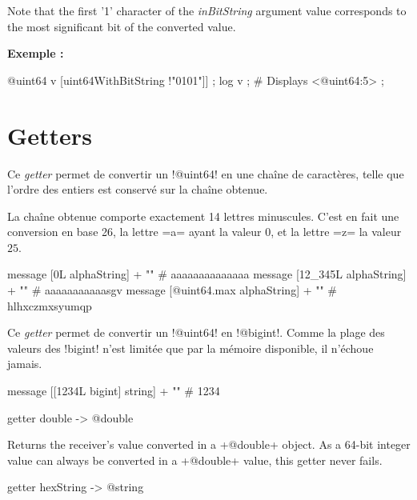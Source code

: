 Note that the first '1' character of the \emph{inBitString} argument value corresponds to the most significant bit of the converted value.

\textbf{Exemple :}
\begin{galgas3}
@uint64 v [uint64WithBitString !"0101"]] ;
log v ; # Displays <@uint64:5> ;
\end{galgas3}


\section{Getters}



Ce \emph{getter} permet de convertir un \ggst!@uint64! en une chaîne de caractères, telle que l'ordre des entiers est conservé sur la chaîne obtenue.

La chaîne obtenue comporte exactement 14 lettres minuscules. C'est en fait une conversion en base 26, la lettre \ggst=a= ayant la valeur $0$, et la lettre \ggst=z= la valeur $25$.


\begin{galgas3}
  message [0L alphaString] + "\n"          # aaaaaaaaaaaaaa
  message [12_345L alphaString] + "\n"     # aaaaaaaaaaasgv
  message [@uint64.max alphaString] + "\n" # hlhxczmxsyumqp
\end{galgas3}


Ce \emph{getter} permet de convertir un \ggst!@uint64! en \ggst!@bigint!. Comme la plage des valeurs des \ggst!bigint! n'est limitée que par la mémoire disponible, il n'échoue jamais.

\begin{galgas3}
  message [[1234L bigint] string] + "\n" # 1234
\end{galgas3}



\begin{galgas3}
getter double -> @double
\end{galgas3}

Returns the receiver's value converted in a \ggst+@double+ object. As a 64-bit integer value can always be converted in a \ggst+@double+ value, this getter never fails.





\begin{galgas3}
getter hexString -> @string
\end{galgas3}

